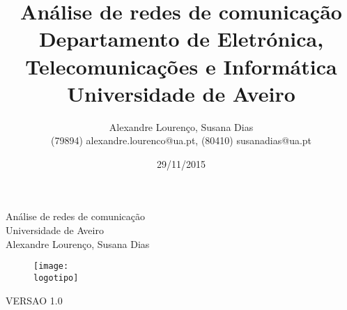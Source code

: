 \documentclass{report}
\begin{document}
%
\def\titulo{Análise de redes de comunicação}
\def\data{29/11/2015}
\def\autores{Alexandre Lourenço, Susana Dias}
\def\autorescontactos{(79894) alexandre.lourenco@ua.pt, (80410) susanadias@ua.pt}
\def\versao{VERSAO 1.0}
\def\departamento{Departamento de Eletrónica, Telecomunicações e Informática}
\def\empresa{Universidade de Aveiro}
\def\logotipo{ua.pdf}
%
%
\begin{titlepage}

\begin{center}
%
\vspace*{50mm}
%
{\Huge \titulo}\\ 
%
\vspace{10mm}
%
{\Large \empresa}\\
%
\vspace{10mm}
%
{\LARGE \autores}\\ 
%
\vspace{30mm}
%
\begin{figure}[h]
\center
\texttt{[image: \\logotipo]}
\end{figure}
%
\vspace{30mm}
\end{center}
%
\begin{flushright}
\versao
\end{flushright}
\end{titlepage}

\title{%
{\Huge\textbf{\titulo}}\\
{\Large \departamento\\ \empresa}
}
%
\author{%
    \autores \\
    \autorescontactos
}
%
\date{\data}
%
\maketitle

\end{document}

